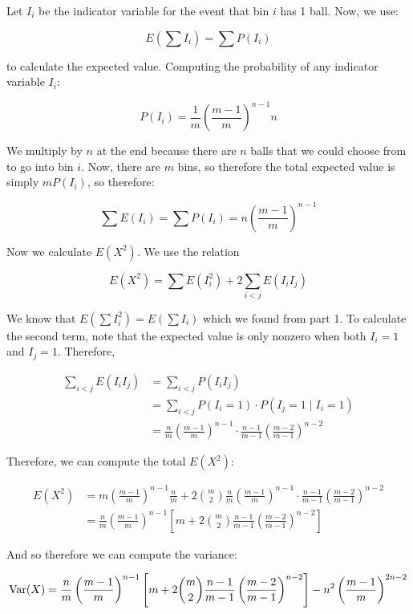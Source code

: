 \documentclass[11pt]{article}
\begin{document}
\begin{solution}
    Let $I_i$ be the indicator variable for the event that bin $i$ has 1 ball. Now, we use:

    \[ E\left(\sum I_i\right) = \sum P(I_i)\]

    to calculate the expected value. Computing the probability of any indicator variable $I_i$:

    \[ P(I_i) = \frac{1}{m} \left(\frac{m-1}{m}\right)^{n-1} n\]

    We multiply by $n$ at the end because there are $n$ balls that we could choose from to go into bin $i$. Now, there are $m$ bins, so therefore the total expected value is simply $mP(I_i)$, so therefore: 

    \[ \sum E( I_i) = \sum P(I_i) = n \left(\frac{m-1}{m}\right)^{n-1}\]

    Now we calculate $E(X^2)$. We use the relation 

    \[ E(X^2) = \sum E\left( I_i^2 \right) + 2\sum_{i < j} E\left(I_iI_j\right)\]

    We know that $E(\sum I_i^2) = E(\sum I_i)$ which we found from part 1. To calculate the second term, note that the expected value is only nonzero when both $I_i= 1$ and $I_j = 1$. Therefore, 

    \begin{align*}
        \sum_{i < j} E( I_i I_j) &= \sum_{i < j}P(I_i I_j)\\
        &= \sum_{i < j}P(I_i = 1) \cdot P(I_j = 1 \mid I_i = 1)\\
        &= \frac{n}{m} \left(\frac{m-1}{m}\right)^{n-1} \cdot \frac{n-1}{m-1} \left(\frac{m-2}{m-1}\right)^{n-2}
    \end{align*}

    Therefore, we can compute the total $E(X^2)$: 

    \begin{align*}
        E(X^2) &= m \left(\frac{m-1}{m}\right)^{n-1} \frac{n}{m} + 2{m \choose 2} \frac{n}{m} \left(\frac{m-1}{m}\right)^{n-1} \cdot \frac{n-1}{m-1} \left(\frac{m-2}{m-1}\right)^{n-2}\\
        &= \frac nm \left(\frac{m-1}{m}\right)^{n-1}\left[ m + 2 {m \choose 2} \frac{n-1}{m-1} \left(\frac{m-2}{m-1}\right)^{n-2}\right]
    \end{align*}

    And so therefore we can compute the variance: 

    \[ \operatorname{Var}(X) = \frac nm \left(\frac{m-1}{m}\right)^{n-1}\left[ m + 2 {m \choose 2} \frac{n-1}{m-1} \left(\frac{m-2}{m-1}\right)^{n-2}\right] - n^2 \left(\frac{m-1}{m}\right)^{2n-2}\]


\end{solution}
\end{document}
